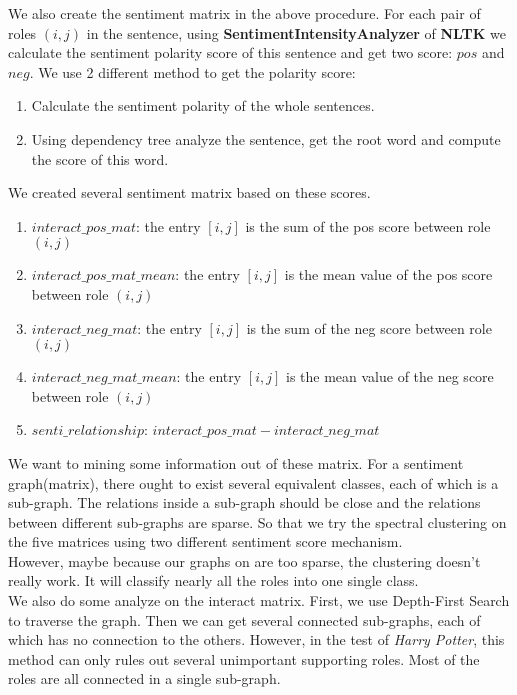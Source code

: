 \documentclass[11pt]{article}
\begin{document}
We also create the sentiment matrix in the above procedure. For each pair of roles $(i, j)$
in the sentence, using \textbf{SentimentIntensityAnalyzer} of \textbf{NLTK} we calculate the sentiment polarity score of this sentence and get two score: $pos$ and $neg$. We use 2 different method to get the polarity score:
\begin{enumerate}
    \item Calculate the sentiment polarity of the whole sentences.
    \item Using dependency tree analyze the sentence, get the root word and compute the score of this word.
\end{enumerate}
We created several sentiment matrix based on these scores.
\begin{enumerate}
    \item $interact\_pos\_mat$: the entry $[i, j]$ is the sum of the pos score between role $(i, j)$
    \item $interact\_pos\_mat\_mean$: the entry $[i, j]$ is the mean value of the pos score between role $(i, j)$
    \item $interact\_neg\_mat$: the entry $[i, j]$ is the sum of the neg score between role $(i, j)$
    \item $interact\_neg\_mat\_mean$: the entry $[i, j]$ is the mean value of the neg score between role $(i, j)$
    \item $senti\_relationship$: $interact\_pos\_mat - interact\_neg\_mat$
\end{enumerate}

We want to mining some information out of these matrix. For a sentiment graph(matrix), there ought to exist several equivalent classes, each of which is a sub-graph. The relations inside a sub-graph should be close and the relations between different sub-graphs are sparse. So that we try the spectral clustering on the five matrices using two different sentiment score mechanism. \\
However, maybe because our graphs on are too sparse, the clustering doesn't really work. It will classify nearly all the roles into one single class. \\

We also do some analyze on the interact matrix. First, we use Depth-First Search to traverse the graph. Then we can get several connected sub-graphs, each of which has no connection to the others. However, in the test of \textit{Harry Potter}, this method can only rules out several unimportant supporting roles. Most of the roles are all connected in a single sub-graph.
\end{document}
